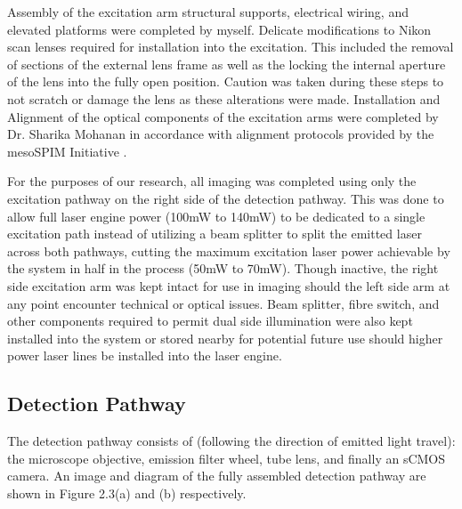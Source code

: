Assembly of the excitation arm structural supports, electrical wiring, and elevated platforms were completed by myself. Delicate modifications to Nikon scan lenses required for installation into the excitation. This included the removal of sections of the external lens frame as well as the locking the internal aperture of the lens into the fully open position. Caution was taken during these steps to not scratch or damage the lens as these alterations were made. Installation and Alignment of the optical components of the excitation arms were completed by Dr. Sharika Mohanan in accordance with alignment protocols provided by the mesoSPIM Initiative \cite{vladimirov_mesospimbenchtop-hardware_2025}. 

For the purposes of our research, all imaging was completed using only the excitation pathway on the right side of the detection pathway. This was done to allow full laser engine power (100mW to 140mW) to be dedicated to a single excitation path instead of utilizing a beam splitter to split the emitted laser across both pathways, cutting the maximum excitation laser power achievable by the system in half in the process (50mW to 70mW). Though inactive, the right side excitation arm was kept intact for use in imaging should the left side arm at any point encounter technical or optical issues. Beam splitter, fibre switch, and other components required to permit dual side illumination were also kept installed into the system or stored nearby for potential future use should higher power laser lines be installed into the laser engine.

\newpage

\subsection{Detection Pathway}
The detection pathway consists of (following the direction of emitted light travel): the microscope objective, emission filter wheel, tube lens, and finally an sCMOS camera. An image and diagram of the fully assembled detection pathway are shown in Figure 2.3(a) and (b) respectively.

